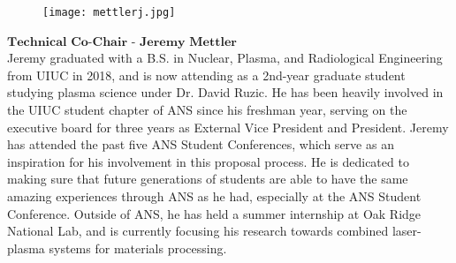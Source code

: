 \setlength\intextsep{0pt}
\begin{figure}
	\begin{center}
		\vspace{-\baselineskip}
		\texttt{[image: mettlerj.jpg]}
	\end{center}
\end{figure}
$\textbf{Technical Co-Chair - Jeremy Mettler}$\\
Jeremy graduated with a B.S. in Nuclear, Plasma, and Radiological Engineering from UIUC in 2018, and is now attending as a 2nd-year graduate student studying plasma science under Dr. David Ruzic. He has been heavily involved in the UIUC student chapter of ANS since his freshman year, serving on the executive board for three years as External Vice President and President. Jeremy has attended the past five ANS Student Conferences, which serve as an inspiration for his involvement in this proposal process. He is dedicated to making sure that future generations of students are able to have the same amazing experiences through ANS as he had, especially at the ANS Student Conference. Outside of ANS, he has held a summer internship at Oak Ridge National Lab, and is currently focusing his research towards combined laser-plasma systems for materials processing.\\


